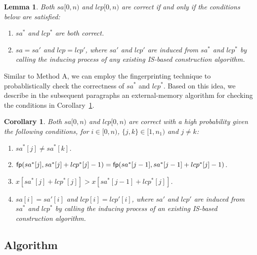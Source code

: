 \documentclass[10pt,journal,compsoc]{IEEEtran}
\newtheorem{Lemma}{Lemma}
\newtheorem{Corollary}{Corollary}
\begin{document}
\begin{Lemma} \label{lemma:2}
Both $sa[0, n)$ and $lcp[0, n)$ are correct if and only if the conditions below are satisfied:

\begin{enumerate}[(1)]
	\item
	$sa^*$ and $lcp^*$ are both correct.
	\item
	$sa = sa'$ and $lcp = lcp'$, where $sa'$ and $lcp'$ are induced from $sa^*$ and $lcp^*$ by calling the inducing process of any existing IS-based construction algorithm.
\end{enumerate}
\end{Lemma}

Similar to Method A, we can employ the fingerprinting technique to probablistically check the correctness of $sa^*$ and $lcp^*$. Based on this idea, we describe in the subsequent paragraphs an external-memory algorithm for checking the conditions in Corollary~\ref{corollary:2}.

\begin{Corollary} \label{corollary:2}
Both $sa[0, n)$ and $lcp[0, n)$ are correct with a high probability given the following conditions, for $i \in [0, n)$, $\{j, k\} \in [1, n_1)$ and $j \ne k$:
	
\begin{enumerate}[(1)]
	\item
	$sa^*[j] \ne sa^*[k]$.
	\item
	${\sf fp}(sa^*[j], sa^*[j] + lcp^*[j] - 1) = {\sf fp}(sa^*[j - 1], sa^*[j - 1] + lcp^*[j] - 1)$.
	\item
	$x[sa^*[j] + lcp^*[j]] > x[sa^*[j - 1] + lcp^*[j]]$.
	\item
	$sa[i] = sa'[i]$ and $lcp[i] = lcp'[i]$, where $sa'$ and $lcp'$ are induced from $sa^*$ and $lcp^*$ by calling the inducing process of an existing IS-based construction algorithm.
\end{enumerate}

\end{Corollary}


\subsection{Algorithm} \label{sec:method2:algorithm}
\end{document}
